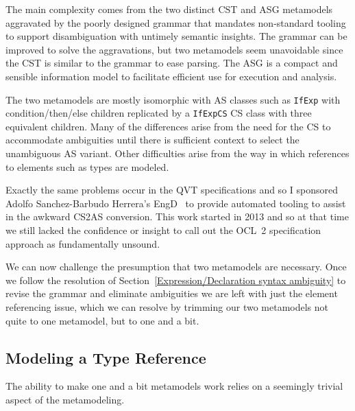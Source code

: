 \documentclass{jot}
\begin{document}
The main complexity comes from the two distinct CST and ASG metamodels aggravated by the poorly designed grammar that mandates non-standard tooling to support disambiguation with untimely semantic insights. The grammar can be improved to solve the aggravations, but two metamodels seem unavoidable since the CST is similar to the grammar to ease parsing. The ASG is a compact and sensible information model to facilitate efficient use for execution and analysis.

The two metamodels are mostly isomorphic with AS classes such as \verb$IfExp$ with condition/then/else children replicated by a \verb$IfExpCS$ CS class with three equivalent children. Many of the differences arise from the need for the CS to accommodate ambiguities until there is sufficient context to select the unambiguous AS variant. Other difficulties arise from the way in which references to elements such as types are modeled.

Exactly the same problems occur in the QVT specifications and so I sponsored Adolfo Sanchez-Barbudo Herrera's EngD~\cite{Sanchez} to provide automated tooling to assist in the awkward CS2AS conversion. This work started in 2013 and so at that time we still lacked the confidence or insight to call out the OCL~2 specification approach as fundamentally unsound.

We can now challenge the presumption that two metamodels are necessary.
Once we follow the resolution of Section~\ref{Expression/Declaration syntax ambiguity} to revise the grammar and eliminate ambiguities we are left with just the element referencing issue, which we can resolve by trimming our two metamodels not quite to one metamodel, but to one and a bit. %

\subsection{Modeling a Type Reference}

The ability to make one and a bit metamodels work relies on a seemingly trivial aspect of the metamodeling.
\end{document}

